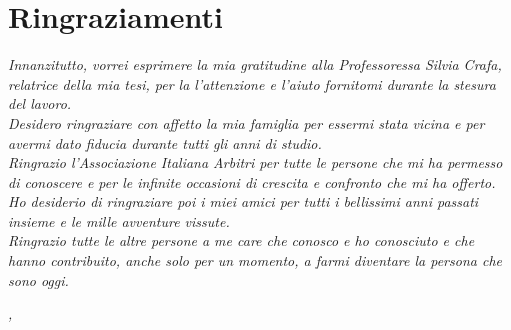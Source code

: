 
\cleardoublepage
{}
{}

\bigskip

\begingroup
\let\clearpage\relax
\let\cleardoublepage\relax
\let\cleardoublepage\relax

\chapter*{Ringraziamenti}

\noindent \textit{Innanzitutto, vorrei esprimere la mia gratitudine alla Professoressa Silvia Crafa, relatrice della mia tesi, per la l'attenzione e l'aiuto fornitomi durante la stesura del lavoro.}\\

\noindent \textit{Desidero ringraziare con affetto la mia famiglia per essermi stata vicina e per avermi dato fiducia durante tutti gli anni di studio.}\\

\noindent \textit{Ringrazio l'Associazione Italiana Arbitri per tutte le persone che mi ha permesso di conoscere e per le infinite occasioni di crescita e confronto che mi ha offerto.}\\

\noindent \textit{Ho desiderio di ringraziare poi i miei amici per tutti i bellissimi anni passati insieme e le mille avventure vissute.}\\

\noindent \textit{Ringrazio tutte le altre persone a me care che conosco e ho conosciuto e che hanno
contribuito, anche solo per un momento, a farmi diventare la persona che sono oggi.}\\
\bigskip

\noindent\textit{\myLocation, \myTime}
\hfill \myName

\endgroup

